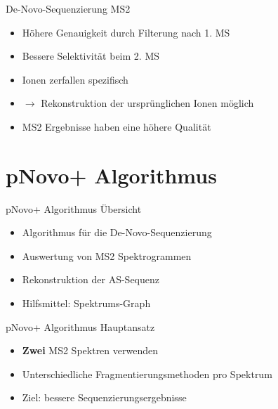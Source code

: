 \documentclass{beamer}
\newcommand{\dashAndSpace}{\textendash \space}
\begin{document}
    \begin{frame}{De-Novo-Sequenzierung \dashAndSpace MS2}
    \begin{itemize}
      \item<1-> Höhere Genauigkeit durch Filterung nach 1. MS
      \item<2-> Bessere Selektivität beim 2. MS
      \item<3-> Ionen zerfallen spezifisch
      \item<4-> $\rightarrow$ Rekonstruktion der ursprünglichen Ionen möglich
      \vspace*{0.5cm}
      \item<5-> MS2 Ergebnisse haben eine höhere Qualität
    \end{itemize}
    \end{frame}

    \section{pNovo+ Algorithmus}
    \begin{frame}{pNovo+ Algorithmus \dashAndSpace Übersicht}
    \begin{itemize}
    \item<1-> Algorithmus für die De-Novo-Sequenzierung
    \item<2-> Auswertung von MS2 Spektrogrammen
    \item<3-> Rekonstruktion der AS-Sequenz
    \item<4-> Hilfsmittel: Spektrums-Graph
    \end{itemize}
    \end{frame}

    \begin{frame}{pNovo+ Algorithmus \dashAndSpace Hauptansatz}
    \begin{itemize}
     \item<1-> \textbf{Zwei} MS2 Spektren verwenden
     \item<2-> Unterschiedliche Fragmentierungsmethoden pro Spektrum
     \item<3-> Ziel: bessere Sequenzierungsergebnisse
     \end{itemize}
    \end{frame}
\end{document}
